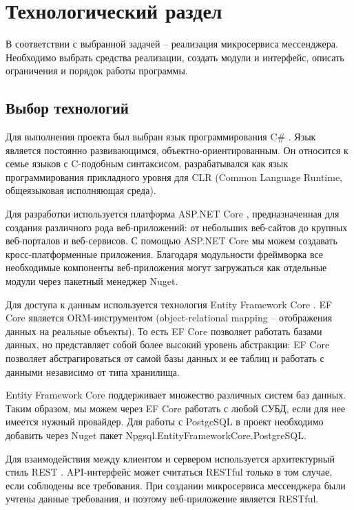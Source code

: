 \chapter{\textbf{Технологический раздел}}

\hfill

В соответствии с выбранной задачей -- реализация микросервиса мессенджера. Необходимо выбрать средства реализации, создать модули и интерфейс, описать ограничения и порядок работы программы. 

\section{\textbf{Выбор технологий}}

Для выполнения проекта был выбран язык программирования C$\#$ \cite{csharp}. Язык является постоянно развивающимся, объектно-ориентированным. Он относится к семье языков с C-подобным синтаксисом, разрабатывался как язык программирования прикладного уровня для CLR (Common Language Runtime, общеязыковая исполняющая среда). 

Для разработки используется платформа ASP.NET Core \cite{aspnet}, предназначенная для создания различного рода веб-приложений: от небольших веб-сайтов до крупных веб-порталов и веб-сервисов. С помощью ASP.NET Core мы можем создавать кросс-платформенные приложения. Благодаря модульности фреймворка все необходимые компоненты веб-приложения могут загружаться как отдельные модули через пакетный менеджер Nuget.

Для доступа к данным используется технология Entity Framework Core \cite{ef}. EF Core является ORM-инструментом (object-relational mapping -- отображения данных на реальные объекты). То есть EF Core позволяет работать базами данных, но представляет собой более высокий уровень абстракции: EF Core позволяет абстрагироваться от самой базы данных и ее таблиц и работать с данными независимо от типа хранилища. 

Entity Framework Core поддерживает множество различных систем баз данных. Таким образом, мы можем через EF Core работать с любой СУБД, если для нее имеется нужный провайдер. Для работы с PostgeSQL в проект необходимо добавить через Nuget пакет Npgsql.EntityFrameworkCore.PostgreSQL. 

Для взаимодействия между клиентом и сервером используется архитектурный стиль REST \cite{rest}. API-интерфейс может считаться RESTful только в том случае, если соблюдены все требования. При создании микросервиса мессенджера были учтены данные требования, и поэтому веб-приложение является RESTful. 

